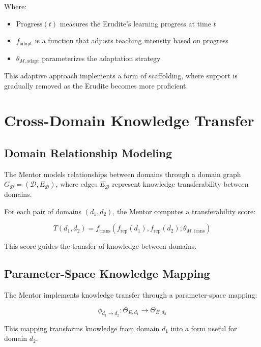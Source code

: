 Where:
\begin{itemize}
\item $\text{Progress}(t)$ measures the Erudite's learning progress at time $t$
\item $f_{\text{adapt}}$ is a function that adjusts teaching intensity based on progress
\item $\theta_{M,\text{adapt}}$ parameterizes the adaptation strategy
\end{itemize}

This adaptive approach implements a form of scaffolding, where support is gradually removed as the Erudite becomes more proficient.

\section{Cross-Domain Knowledge Transfer}

\subsection{Domain Relationship Modeling}

The Mentor models relationships between domains through a domain graph $G_{\mathcal{D}} = (\mathcal{D}, E_{\mathcal{D}})$, where edges $E_{\mathcal{D}}$ represent knowledge transferability between domains.

For each pair of domains $(d_1, d_2)$, the Mentor computes a transferability score:

\begin{equation}
T(d_1, d_2) = f_{\text{trans}}(f_{\text{rep}}(d_1), f_{\text{rep}}(d_2); \theta_{M,\text{trans}})
\end{equation}

This score guides the transfer of knowledge between domains.

\subsection{Parameter-Space Knowledge Mapping}

The Mentor implements knowledge transfer through a parameter-space mapping:

\begin{equation}
\phi_{d_1 \rightarrow d_2} : \Theta_{E,d_1} \rightarrow \Theta_{E,d_2}
\end{equation}

This mapping transforms knowledge from domain $d_1$ into a form useful for domain $d_2$.

